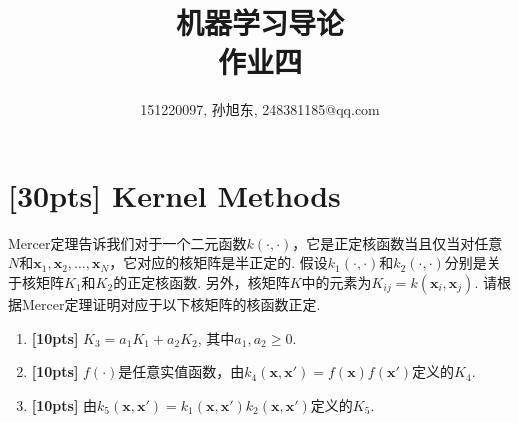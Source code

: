 \documentclass[a4paper,UTF8]{article}
\numberwithin{equation}{section}
\begin{document}
\title{机器学习导论\\
作业四}
\author{151220097, 孙旭东, 248381185@qq.com}
\maketitle

\section{[30pts] Kernel Methods}
Mercer定理告诉我们对于一个二元函数$k(\cdot,\cdot)$，它是正定核函数当且仅当对任意$N$和$\mathbf{x}_1, \mathbf{x}_2,\ldots,\mathbf{x}_N$，它对应的核矩阵是半正定的. 假设$k_1(\cdot,\cdot)$和$k_2(\cdot,\cdot)$分别是关于核矩阵$K_1$和$K_2$的正定核函数. 另外，核矩阵$K$中的元素为$K_{ij}=k(\mathbf{x}_i,\mathbf{x}_j)$. 请根据Mercer定理证明对应于以下核矩阵的核函数正定.
\begin{enumerate}[(1)]
	\item \textbf{[10pts]} $K_3=a_1K_1+a_2K_2$, 其中$a_1,a_2\geq 0$.
	\item \textbf{[10pts]} $f(\cdot)$是任意实值函数，由$k_4(\mathbf{x},\mathbf{x}')=f(\mathbf{x})f(\mathbf{x}')$定义的$K_4$.
	\item \textbf{[10pts]} 由$k_5(\mathbf{x},\mathbf{x}')=k_1(\mathbf{x},\mathbf{x}')k_2(\mathbf{x},\mathbf{x}')$定义的$K_5$.
\end{enumerate}
\end{document}
